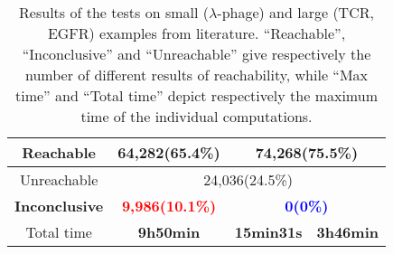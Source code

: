 \begin{table}[ht]
\begin{tabular}{|c|c|c|c|}
     \hline
     Reachable & 64,282(65.4\%)  & \multicolumn{2}{c|}{74,268(75.5\%)} \\
     \hline
     Unreachable&\multicolumn{3}{c|}{24,036(24.5\%)}\\
     \hline
     \textbf{Inconclusive} &\textcolor{red}{\textbf{9,986(10.1\%)}}&\multicolumn{2}{c|}{\textcolor{blue}{\textbf{0(0\%)}}}   \\
     \hline
     Total time & \textbf{9h50min}      & \textbf{15min31s}         & \textbf{3h46min} \\
     \hline
    \end{tabular}
\caption[Comparison of different analyzers]{
Results of the tests on small ($\lambda$-phage) and large (TCR, EGFR) examples from literature. 
``Reachable'', ``Inconclusive'' and ``Unreachable'' give respectively the number of different results of reachability, while ``Max time'' and ``Total time'' depict respectively the maximum time of the individual computations.}\label{tab:results}
\end{table}

